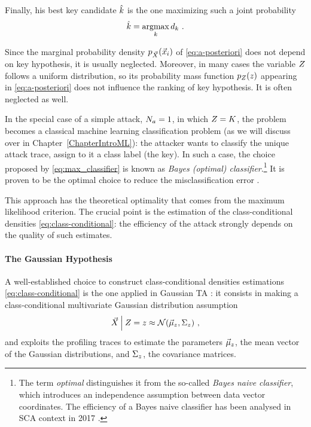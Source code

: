 Finally, his best key candidate $\hat{k}$ is the one maximizing such a joint probability
\begin{equation}\label{eq:max_classifier}
\hat{k} = \operatorname*{argmax}_{k} d_{k} \mbox{ .}
\end{equation}

\begin{remark}Since the marginal probability density $p_{\vec{X}}(\vec{x}_i)$ of \eqref{eq:a-posteriori} does not depend on key hypothesis, it is usually neglected. Moreover, in many cases the variable $Z$ follows a uniform distribution, so its probability mass function $p_{Z}(z)$ appearing in \eqref{eq:a-posteriori}  does not influence the ranking of key hypothesis. It is often neglected as well. 
\end{remark}

\begin{remark}
In the special case of a simple attack, \ie $N_a = 1$, in which $Z = K$, the problem becomes a classical machine learning classification problem (as we will discuss over in Chapter~\ref{ChapterIntroML}): the attacker wants to classify the unique attack trace, \ie assign to it a class label (the key). In such a case, the choice proposed by \eqref{eq:max_classifier} is known as \emph{Bayes (optimal) classifier}.\footnote{The term \emph{optimal} distinguishes it from the so-called \emph{Bayes naive classifier}, which introduces an independence assumption between data vector coordinates. The efficiency of a Bayes naive classifier has been analysed in SCA context in 2017 \cite{picek2017template}.} It is proven to be the optimal choice to reduce the misclassification error \cite{christopher2006pattern}.
\end{remark}

This approach has the theoretical optimality that comes from the maximum likelihood criterion. The crucial point is the estimation of the class-conditional densities \eqref{eq:class-conditional}: the efficiency of the attack strongly depends on the quality of such estimates. 

\paragraph*{The Gaussian Hypothesis} A well-established choice to construct class-conditional densities estimations \ref{eq:class-conditional} is the one applied in Gaussian TA \cite{Chari2003}: it consists in making a class-conditional multivariate Gaussian distribution assumption
\begin{equation}\label{eq:gaussian_assumption}
\vec{X}\:\Big\vert\: Z =z \approx \mathcal{N}(\vec{\mu}_z, \Sigma_z)\mbox{ ,}
\end{equation} 
and exploits the profiling traces to estimate the  parameters $\vec{\mu}_z$, \ie the mean vector of the Gaussian distributions, and $ \Sigma_z$, \ie the covariance matrices. \\

